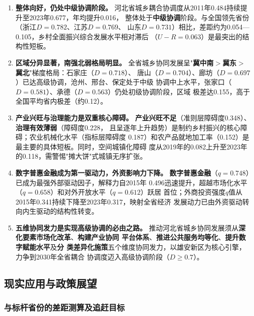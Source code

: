 \documentclass[12pt, a4paper, twoside]{ctexart}
\begin{document}
\begin{enumerate}[leftmargin=2em, itemsep=4pt]
  \item \textbf{整体向好，仍处中级协调阶段。}
        河北省城乡耦合协调度从2011年0.484持续提升至2023年0.677，年均提升0.016，
        整体处于\textbf{中级协调}阶段。与全国领先省份（浙江$D=0.782$、江苏$D=0.769$、
        山东$D=0.731$）相比，差距约为0.054—0.105，乡村全面振兴综合发展水平相对滞后
        （$U-R=0.063$）是最突出的结构性短板。

  \item \textbf{区域分异显著，南强北弱格局明显。}
        全省城乡协同发展呈"\textbf{冀中南$>$冀东$>$冀北}"梯度格局：石家庄（$D=0.718$）、
        唐山（$D=0.704$）、廊坊（$D=0.697$）已达高级协调，沧州、邢台、保定处于中级
        协调中上水平，张家口（$D=0.581$）、承德（$D=0.563$）仍处初级协调阶段，区域
        极差达0.155，高于全国平均省内极差（约0.12）。

  \item \textbf{产业兴旺与治理能力是双重核心障碍。}
        \textbf{产业兴旺不足}（准则层障碍度0.348）、\textbf{治理有效薄弱}（障碍度0.228，
        且呈逐年上升趋势）是制约乡村振兴的核心障碍；农业机械化水平（指标层障碍度
        0.187）和农产品就地加工率（0.152）是最主要的具体短板。同时，空间城镇化障碍
        度从2019年的0.082上升至2023年的0.118，需警惕"摊大饼"式城镇无序扩张。

  \item \textbf{数字普惠金融成为第一驱动力，外资影响力下降。}
        \textbf{数字普惠金融}（$q=0.748$）已成为最强外部驱动因子，解释力自2015年
        0.496迅速提升，超越市场化水平（$q=0.658$）和对外开放水平（$q=0.612$）跃居
        首位；外商投资强度$q$值从2015年0.341持续下降至2023年0.317，映射全省经济
        发展动力已由外资驱动转向内生驱动的结构性转变。

  \item \textbf{五维协同发力是实现高级协调的必由之路。}
        推动河北省城乡协同发展须从\textbf{深化要素市场化改革}、\textbf{构建产业协同
        平台体系}、\textbf{推进公共服务均等化}、\textbf{提升数字赋能水平}及\textbf{分
        类差异化施策}五个维度协同发力，以雄安新区为核心引擎，力争到2030年全省耦合
        协调度迈入高级协调阶段（$D\geq0.7$）。
\end{enumerate}

\subsection{现实应用与政策展望}

\subsubsection{与标杆省份的差距测算及追赶目标}
\end{document}
